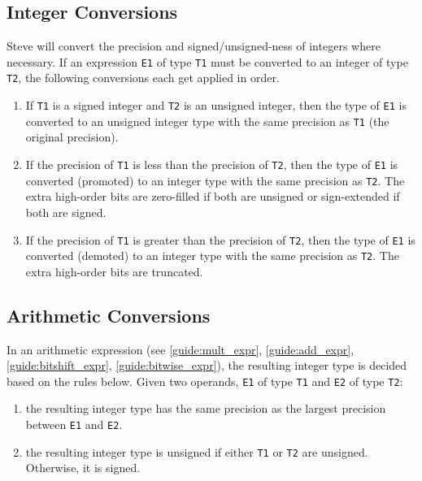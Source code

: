 \subsection{Integer Conversions} \label{guide:int_conv}

Steve will convert the precision and signed/unsigned-ness of integers where necessary. If an expression \texttt{E1} of type \texttt{T1} must be converted to an integer of type \texttt{T2}, the following conversions each get applied in order.

\begin{enumerate}
\item If \texttt{T1} is a signed integer and \texttt{T2} is an unsigned integer, then the type of \texttt{E1} is converted to an unsigned integer type with the same precision as \texttt{T1} (the original precision).

\item If the precision of \texttt{T1} is less than the precision of \texttt{T2}, then the type of \texttt{E1} is converted (promoted) to an integer type with the same precision as \texttt{T2}. The extra high-order bits are zero-filled if both are unsigned or sign-extended if both are signed.

\item If the precision of \texttt{T1} is greater than the precision of \texttt{T2}, then the type of \texttt{E1} is converted (demoted) to an integer type with the same precision as \texttt{T2}. The extra high-order bits are truncated.
\end{enumerate}

\subsection{Arithmetic Conversions} \label{guide:arith_conv}

In an arithmetic expression (see \ref{guide:mult_expr}, \ref{guide:add_expr}, \ref{guide:bitshift_expr}, \ref{guide:bitwise_expr}), the resulting integer type is decided based on the rules below. Given two operands, \texttt{E1} of type \texttt{T1} and \texttt{E2} of type \texttt{T2}:

\begin{enumerate}
\item the resulting integer type has the same precision as the largest precision between \texttt{E1} and \texttt{E2}.

\item the resulting integer type is unsigned if either \texttt{T1} or \texttt{T2} are unsigned. Otherwise, it is signed.
\end{enumerate}

